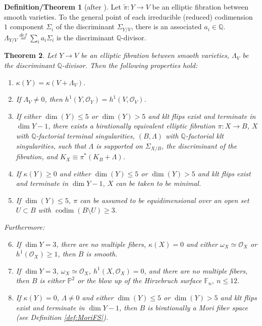 \documentclass[11pt]{amsart}
\newtheorem{theorem}{Theorem}[section]
\theoremstyle{definition}
\theoremstyle{definition}
\newtheorem{defthm}[theorem]{Definition/Theorem}
\theoremstyle{remark}
\theoremstyle{remark}
\theoremstyle{definition}
\theoremstyle{conjecture}
\newcommand{\Q}{\mathbb Q}
\begin{document}
\begin{defthm}[after \cite{Kodaira1963}] Let  $\tilde \pi : Y \rightarrow V$ be an elliptic fibration between smooth varieties. To the general point of each irreducible (reduced) codimension $1$ component $\Sigma_i$ of   the discriminant  $\Sigma_{Y/V}$, there is an associated $a_i \in \mathbb{Q}$.
 $\Lambda_{Y/V}\stackrel{def}=\sum _ia_i\Sigma_i$  is  %
 the discriminant $\mathbb{Q}$-divisor.
\end{defthm}
\color{black}
\begin{theorem}\label{thm:birminmodel} 
	Let  $ 
	Y \rightarrow V$ be an elliptic fibration between smooth varieties, $\Lambda_V$ be the discriminant $\Q$-divisor. Then  the following properties hold:
    	\begin{enumerate}
        \item $\kappa(Y)=\kappa(V + \Lambda_V).$
 \item If $\Lambda_V \neq 0$, then $h^1(Y, \mathcal{O}_Y )= h^1(V, \mathcal{O}_V)$.
 
\item  If either $\dim (Y) \leq 5$ or $\dim (Y) > 5$ and klt flips exist and terminate in ${\dim Y-1}$, there exists a birationally equivalent elliptic fibration $  \pi :  X  \to B $, $X$ with  $\mathbb{Q}$-factorial terminal singularities, $( B ,   \Lambda )$ with $\mathbb{Q}$-factorial klt singularities,  such that 
			$  \Lambda  $ is supported on $\Sigma_{X/B}$, the discriminant  of the fibration, and $K_{ X }  \equiv  {\pi}^*(K_{ B } +   \Lambda )$.
  \item  If $\kappa (Y) \geq 0$ and either  $\dim (Y) \leq 5$ or $\dim (Y) > 5$ and klt flips exist and terminate in ${\dim Y-1}$, $X$ can be taken to be minimal.
\item  If $\dim (Y) \leq 5$, $\pi$ can be assumed to be
		equidimensional over an open set $U \subset B$ with $\operatorname{codim} (B \setminus U )\geq 3$.

\end{enumerate}
Furthermore:
\begin{enumerate}
 \setcounter{enumi}{5}

\item If  $\dim Y = 3$,  there are no multiple fibers, $\kappa(X)=0$  and either $\omega_X \simeq \mathcal{O}_X$   or $h^1(\mathcal{O}_X) \geq 1$, then $ B $ is smooth.
\item If  $\dim Y = 3$, $\omega_X \simeq \mathcal{O}_X$,   $h^1(X, \mathcal{O}_X)=0$, and there are no multiple fibers,   then $B$ is either $\mathbb{P}^2$ or the blow up of the Hirzebruch surface $\mathbb{F}_n, \  n \leq 12$.
\item If  $\kappa (Y)= 0$, $\Lambda \neq 0$ and either $\dim (Y) \leq 5$ or $\dim (Y) > 5$  and klt flips exist and terminate in ${\dim Y-1}$, then $B$ is birationally a Mori fiber space (see Definition \ref{def:MoriFS}).

 
 
		\end{enumerate}
	\end{theorem}
\end{document}
